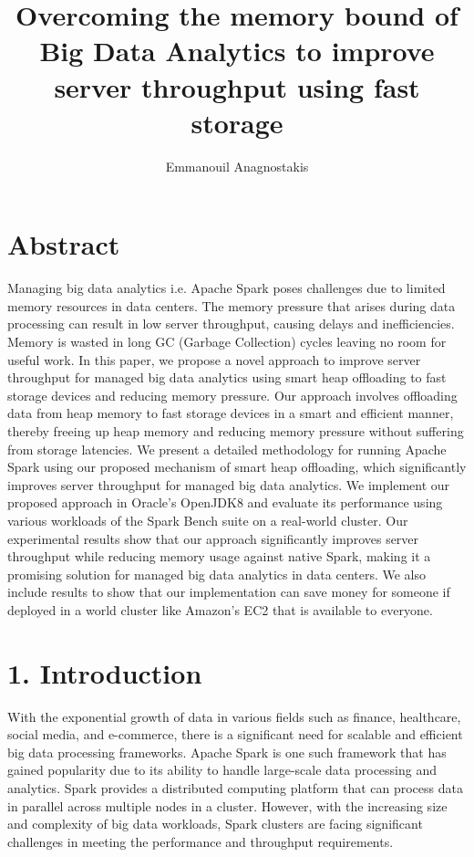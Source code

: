 \documentclass[twocolumn,10pt]{asme2e}
\title{Overcoming the memory bound of Big Data Analytics to improve server throughput using fast storage}
\author{Emmanouil Anagnostakis
    \affiliation{
	    Graduate Research Assistant\\
	    Computer Architecture and VLSI Systems Laboratory, ICS-FORTH\\
	    Heraklion, Greece\\
      manosanag@ics.forth.gr
    }	
}
\begin{document}
\maketitle    

\section*{Abstract}

Managing big data analytics i.e. Apache Spark poses challenges due to limited memory resources in data centers. The memory pressure that arises during data processing can result in low server throughput, causing delays and inefficiencies. Memory is wasted in long GC (Garbage Collection) cycles leaving no room for useful work. In this paper, we propose a novel approach to improve server throughput for managed big data analytics using smart heap offloading to fast storage devices and reducing memory pressure. Our approach involves offloading data from heap memory to fast storage devices in a smart and efficient manner, thereby freeing up heap memory and reducing memory pressure without suffering from storage latencies. We present a detailed methodology for running Apache Spark using our proposed mechanism of smart heap offloading, which significantly improves server throughput for managed big data analytics. We implement our proposed approach in Oracle's OpenJDK8 and evaluate its performance using various workloads of the Spark Bench suite on a real-world cluster. Our experimental results show that our approach significantly improves server throughput while reducing memory usage against native Spark, making it a promising solution for managed big data analytics in data centers. We also include results to show that our implementation can save money for someone if deployed in a world cluster like Amazon's EC2 that is available to everyone. 

\section*{1. Introduction}

With the exponential growth of data in various fields such as finance, healthcare, social media, and e-commerce, there is a significant need for scalable and efficient big data processing frameworks. Apache Spark \cite{Spark} is one such framework that has gained popularity due to its ability to handle large-scale data processing and analytics. Spark provides a distributed computing platform that can process data in parallel across multiple nodes in a cluster. However, with the increasing size and complexity of big data workloads, Spark clusters are facing significant challenges in meeting the performance and throughput requirements.
\end{document}
